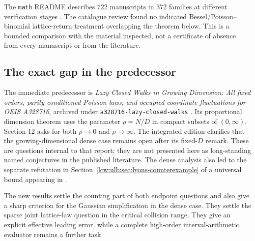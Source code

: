 \documentclass[11pt,letterpaper]{article}
\theoremstyle{remark}\newtheorem{remark}[theorem]{Remark}
\begin{document}
The \texttt{math} README describes 722 manuscripts in 372 families at
different verification stages \cite{mathrepo}. The catalogue review
found no indicated Bessel/Poisson--binomial lattice-return treatment
overlapping the theorem below. This is a bounded comparison with the
material inspected, not a certificate of absence from every manuscript
or from the literature.

\subsection{The exact gap in the predecessor}

The immediate predecessor is \emph{Lazy Closed Walks in Growing Dimension: All fixed orders,
parity conditioned Poisson laws, and occupied coordinate fluctuations
for OEIS A328716}, archived
under \texttt{a328716-lazy-closed-walks} \cite{lcw}. Its proportional
dimension theorem uses the parameter $\rho=N/D$ in compact subsets of
$(0,\infty)$. Section 12 asks for both $\rho\to0$ and $\rho\to\infty$.
The integrated edition clarifies that the growing-dimensional dense
case remains open after its fixed-$D$ remark. These are questions
internal to that report; they are not presented here as long-standing
named conjectures in the published literature. The dense analysis
also led to the separate refutation in Section~\ref{lcw:ulb:sec:lyons-counterexample}
of a universal bound appearing in \cite{felkerlyons,ballsterbenz}.

The new results settle the counting part of both endpoint questions and
also give a sharp criterion for the Gaussian simplification in the dense
case. They settle the sparse joint lattice-law question in the critical
collision range. They give an explicit effective leading error, while a
complete high-order interval-arithmetic evaluator remains a further task.
\end{document}
